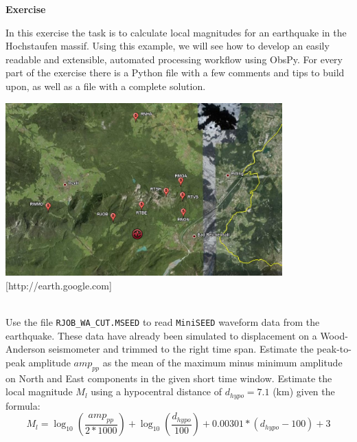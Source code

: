 \documentclass{LMUexercise}
\begin{document}
%
%
%
\vspace*{1cm}
\begin{center}
\textbf{\Large Exercise}
\end{center}
%
%
In this exercise the task is to calculate local magnitudes for an earthquake in
the Hochstaufen massif. Using this example, we will see how to develop an
easily readable and extensible, automated processing workflow using ObsPy. For
every part of the exercise there is a Python file with a few comments and tips
to build upon, as well as a file with a complete solution.
\quad\\[1ex]

\begin{center}
\includegraphics[width=0.8\textwidth]{rh.jpg}
\\[-1ex]{\tiny [http://earth.google.com]}
\end{center}

\\
Use the file \verb#RJOB_WA_CUT.MSEED# to read \verb#MiniSEED# waveform data
from the earthquake. These data have already been simulated to displacement on
a Wood-Anderson seismometer and trimmed to the right time span. Estimate the
peak-to-peak amplitude $amp_{pp}$ as the mean of the maximum minus minimum
amplitude on North and East components in the given short time window. Estimate
the local magnitude $M_l$ using a hypocentral distance of $d_{hypo}=7.1$ (km)
given the formula:
\[
M_l = \log_{10}(\frac{amp_{pp}}{2*1000}) + \log_{10}(\frac{d_{hypo}}{100}) + 0.00301 * (d_{hypo} - 100) + 3
\]
\vspace*{3.0em}
\end{document}

